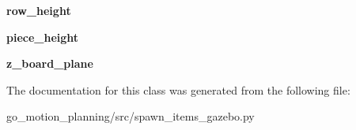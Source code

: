 \begin{DoxyCompactItemize}
\item 
\mbox{\label{classspawn__items__gazebo_1_1spawn__items_ae619e75277c1b139583d7ba0f9005eb5}} 
{\bfseries row\+\_\+height}
\item 
\mbox{\label{classspawn__items__gazebo_1_1spawn__items_ad7a31e6c348afeede5774cc2c855b577}} 
{\bfseries piece\+\_\+height}
\item 
\mbox{\label{classspawn__items__gazebo_1_1spawn__items_aec1e2341277938f474c28999b19b180a}} 
{\bfseries z\+\_\+board\+\_\+plane}
\end{DoxyCompactItemize}


The documentation for this class was generated from the following file\+:\begin{DoxyCompactItemize}
\item 
go\+\_\+motion\+\_\+planning/src/spawn\+\_\+items\+\_\+gazebo.\+py\end{DoxyCompactItemize}
